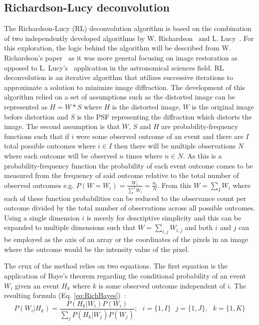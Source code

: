 \subsection{Richardson-Lucy deconvolution}\label{subsec:richardson_lucy}
The Richardson-Lucy (RL) deconvolution algorithm is based on the combination of two independently developed algorithms by W. Richardson~\cite{Richardson} and L. Lucy~\cite{LucyL}. For this exploration, the logic behind the algorithm will be described from W. Richardson's paper~\cite{Richardson} as it was more general focusing on image restoration as opposed to L. Lucy's~\cite{LucyL} application in the astronomical sciences field. RL deconvolution is an iterative algorithm that utilizes successive iterations to approximate a solution to minimize image diffraction. The development of this algorithm relied on a set of assumptions such as the distorted image can be represented as $H=W*S$ where $H$ is the distorted image, $W$ is the original image before distortion and $S$ is the PSF representing the diffraction which distorts the image. The second assumption is that $W$, $S$ and $H$ are probability-frequency functions such that if $i$ were some observed outcome of an event and there are $I$ total possible outcomes where $i \in I$ then there will be multiple observations $N$ where each outcome will be observed $n$ times where $n \in N$. As this is a probability-frequency function the probability of each event outcome comes to be measured from the frequency of said outcome relative to the total number of observed outcomes e.g. $P(W=W_i) = \frac{W_i}{\sum^I W_i} = \frac{n_i}{N}$. From this $W = \sum_I W_i$ where each of these function probabilities can be reduced to the observance count per outcome divided by the total number of observations across all possible outcomes. Using a single dimension $i$ is merely for descriptive simplicity and this can be expanded to multiple dimensions such that $W = \sum_{i,j} W_{i,j}$ and both $i$ and $j$ can be employed as the axis of an array or the coordinates of the pixels in an image where the outcome would be the intensity value of the pixel.\par The crux of the method relies on two equations. The first equation is the application of Baye's theorem regarding the conditional probability of an event $W_i$ given an event $H_k$ where $k$ is some observed outcome independent of $i$. The resulting formula (Eq. \ref{eq:RichBayes})~\cite[Eq. 1]{Richardson}:
\begin{equation}\label{eq:RichBayes}
    P(W_i|H_k)=\frac{P(H_k|W_i)P(W_i)}{\sum_j P(H_k|W_j)P(W_j)};\text{ }i=\{1,I\}\text{ }j=\{1,J\},\text{ }k=\{1, K\}
\end{equation}

